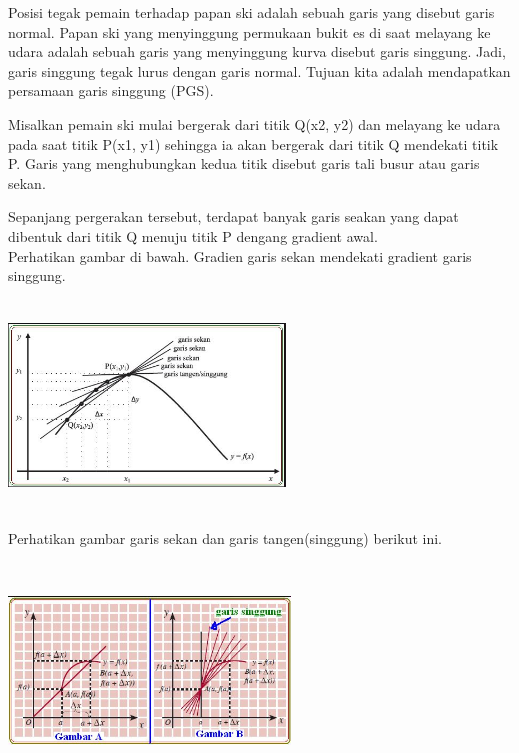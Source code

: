 \documentclass[11pt,fleqn]{book} %
\begin{document}
\noindent 
Posisi tegak pemain terhadap papan ski adalah sebuah garis yang disebut garis normal. Papan ski yang menyinggung permukaan bukit es di saat melayang ke udara adalah sebuah garis yang menyinggung kurva disebut garis singgung. Jadi, garis singgung tegak lurus dengan garis normal. Tujuan kita adalah mendapatkan persamaan garis singgung (PGS).

\noindent 
Misalkan pemain ski mulai bergerak dari titik Q(x2, y2) dan melayang ke udara pada saat titik P(x1, y1) sehingga ia akan bergerak dari titik Q mendekati titik P. Garis yang menghubungkan kedua titik disebut garis tali busur atau garis sekan.

\noindent 
Sepanjang pergerakan tersebut, terdapat banyak garis seakan yang dapat dibentuk dari titik Q menuju titik P dengang gradient awal.\\

\noindent 
Perhatikan gambar di bawah. Gradien garis sekan mendekati gradient garis singgung.

\noindent 
\begin{center}
\noindent \includegraphics*[width=2.90in, height=2.19in, keepaspectratio=false, trim=0.00in 0.11in 0.00in 0.00in]{Pictures/TurunanFungsi3.JPG}\\
\end{center}

\noindent 
Perhatikan gambar garis sekan dan garis tangen(singgung) berikut ini.

\noindent 
\begin{center}
\noindent \includegraphics*[width=2.95in, height=2.25in, keepaspectratio=false, trim=0.00in 0.11in 0.00in 0.00in]{Pictures/TurunanFungsi4.JPG}
\end{center}
\end{document}

